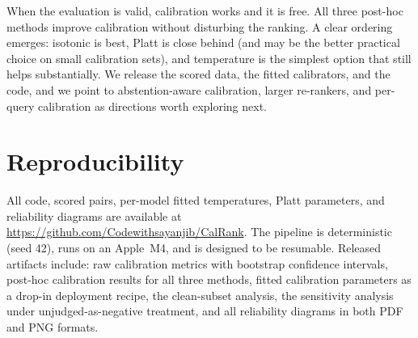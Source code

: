 When the evaluation is valid, calibration works and it is free. All three
post-hoc methods improve calibration without disturbing the ranking. A clear
ordering emerges: isotonic is best, Platt is close behind (and may be the
better practical choice on small calibration sets), and temperature is the
simplest option that still helps substantially. We release the scored data, the
fitted calibrators, and the code, and we point to abstention-aware calibration,
larger re-rankers, and per-query calibration as directions worth exploring next.

\section*{Reproducibility}
All code, scored pairs, per-model fitted temperatures, Platt parameters, and
reliability diagrams are available at \url{https://github.com/Codewithsayanjib/CalRank}. The pipeline is
deterministic (seed 42), runs on an Apple~M4, and is designed to be resumable.
Released artifacts include: raw calibration metrics with bootstrap confidence
intervals, post-hoc calibration results for all three methods, fitted calibration
parameters as a drop-in deployment recipe, the clean-subset analysis, the
sensitivity analysis under unjudged-as-negative treatment, and all reliability
diagrams in both PDF and PNG formats.

